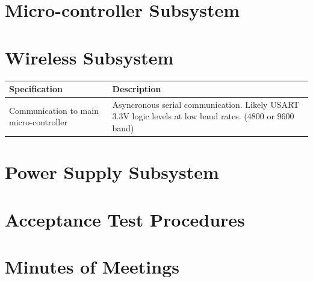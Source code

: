 \documentclass[12pt]{article}
\begin{document}
\section{Micro-controller Subsystem}

\section{Wireless Subsystem}

\begin{center}
  \begin{table}[htp]
    
    \hskip-2.2cm\begin{tabular}{|p{8cm}|p{10cm}|}
        \hline
        \textbf{Specification} & \textbf{Description} \\
        \hline
        Communication to main micro-controller & Asyncronous serial communication. Likely USART 3.3V logic levels at low
        baud rates. (4800 or 9600 baud) \\



        \hline

    \end{tabular}    
    
    \label{tab:summary_measurments}
   \end{table}
\end{center}


\section{Power Supply Subsystem}

\newpage
\section{Acceptance Test Procedures}

\newpage
\section{Minutes of Meetings}

\newpage
%
%
\end{document}
